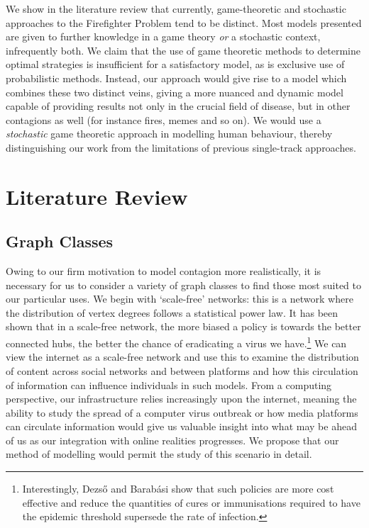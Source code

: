 \documentclass[hidelinks,a4paper,11pt]{article}
\numberwithin{equation}{section}
\begin{document}
We show in the literature review that currently, game-theoretic and stochastic approaches to the Firefighter Problem tend to be distinct. Most models presented are given to further knowledge in a game theory {\it or} a stochastic context, infrequently both. We claim that the use of game theoretic methods to determine optimal strategies is insufficient for a satisfactory model, as is exclusive use of probabilistic methods. Instead, our approach would give rise to a model which combines these two distinct veins, giving a more nuanced and dynamic model capable of providing results not only in the crucial field of disease, but in other contagions as well (for instance fires, memes and so on). We would use a {\it stochastic} game theoretic approach in modelling human behaviour, thereby distinguishing our work from the limitations of previous single-track approaches.


\section{Literature Review}
\label{sec:litreview}

\subsection{Graph Classes}

Owing to our firm motivation to model contagion more realistically, it is necessary for us to consider a variety of graph classes to find those most suited to our particular uses. We begin with `scale-free' networks: this is a network where the distribution of vertex degrees follows a statistical power law. It has been shown that in a scale-free network, the more biased a policy is towards the better connected hubs, the better the chance of eradicating a virus we have.\footnote{Interestingly, Dezs\H{o} and Barab\'{a}si show that such policies are more cost effective and reduce the quantities of cures or immunisations required to have the epidemic threshold supersede the rate of infection.} \cite{dezso02} We can view the internet as a scale-free network and use this to examine the distribution of content across social networks and between platforms \cite{obrien19} and how this circulation of information can influence individuals in such models. \cite{gleeson14} From a computing perspective, our infrastructure relies increasingly upon the internet, meaning the ability to study the spread of a computer virus outbreak or how media platforms can circulate information would give us valuable insight into what may be ahead of us as our integration with online realities progresses. We propose that our method of modelling would permit the study of this scenario in detail.\\
\end{document}
